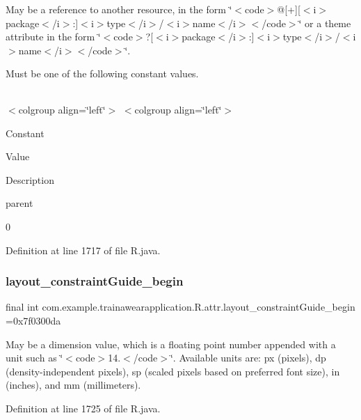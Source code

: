 May be a reference to another resource, in the form \char`\"{}$<$code$>$@\mbox{[}+\mbox{]}\mbox{[}$<$i$>$package$<$/i$>$\+:\mbox{]}$<$i$>$type$<$/i$>$/$<$i$>$name$<$/i$>$$<$/code$>$\char`\"{} or a theme attribute in the form \char`\"{}$<$code$>$?\mbox{[}$<$i$>$package$<$/i$>$\+:\mbox{]}$<$i$>$type$<$/i$>$/$<$i$>$name$<$/i$>$$<$/code$>$\char`\"{}. 

Must be one of the following constant values.

\tabulinesep=1mm
\begin{longtabu}spread 0pt [c]{*{0}{|X[-1]}|}
\hline
\end{longtabu}
$<$colgroup align=\char`\"{}left\char`\"{}$>$ $<$colgroup align=\char`\"{}left\char`\"{}$>$ 

Constant

Value

Description 

parent

0

Definition at line 1717 of file R.\+java.

\mbox{\label{classcom_1_1example_1_1trainawearapplication_1_1_r_1_1attr_a5375a3b18c2ac1e6d41bbbd181594fdd}} 
\subsubsection{\texorpdfstring{layout\_constraintGuide\_begin}{layout\_constraintGuide\_begin}}
{\footnotesize\ttfamily final int com.\+example.\+trainawearapplication.\+R.\+attr.\+layout\+\_\+constraint\+Guide\+\_\+begin =0x7f0300da\hspace{0.3cm}{\ttfamily [static]}}

May be a dimension value, which is a floating point number appended with a unit such as \char`\"{}$<$code$>$14.\+5sp$<$/code$>$\char`\"{}. Available units are\+: px (pixels), dp (density-\/independent pixels), sp (scaled pixels based on preferred font size), in (inches), and mm (millimeters). 

Definition at line 1725 of file R.\+java.

\mbox{\label{classcom_1_1example_1_1trainawearapplication_1_1_r_1_1attr_afb10d226537df3f1314fa03048e468aa}} 
